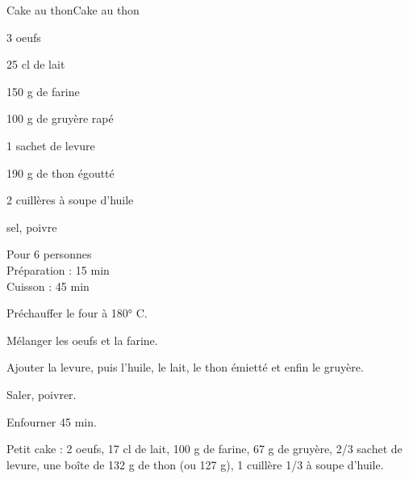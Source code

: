 \begin{recette}{Cake au thon}{Cake au thon}

\begin{ingredients}
3 oeufs\par
25 cl de lait\par
150 g de farine\par
100 g de gruyère rapé\par
1 sachet de levure\par
190 g de thon égoutté\par
2 cuillères à soupe d'huile\par
sel, poivre\par
\end{ingredients}

\begin{infos}
Pour 6 personnes\\
Préparation : 15 min\\
Cuisson : 45 min\\
\end{infos}

\begin{etapes}
\item Préchauffer le four à 180° C.
\item Mélanger les oeufs et la farine.
\item Ajouter la levure, puis l'huile, le lait, le thon émietté et enfin le gruyère.
\item Saler, poivrer.
\item Enfourner 45 min.
\end{etapes}

\begin{conseils}
Petit cake : 2 oeufs, 17 cl de lait, 100 g de farine, 67 g de gruyère, 2/3 sachet de levure, une boîte de 132 g de thon (ou 127 g), 1 cuillère 1/3 à soupe d'huile.
\end{conseils}

\end{recette}